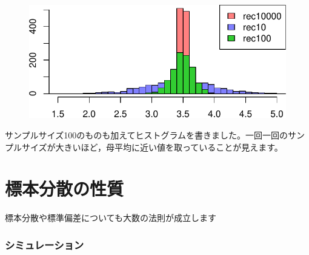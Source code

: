 \documentclass[
  letterpaper,
  DIV=11,
  numbers=noendperiod]{scrreprt}
\begin{document}
\begin{figure}[H]

{\centering \includegraphics{6_hyohon_files/figure-pdf/unnamed-chunk-6-1.pdf}

}

\end{figure}

サンプルサイズ100のものも加えてヒストグラムを書きました。一回一回のサンプルサイズが大きいほど，母平均に近い値を取っていることが見えます。

\hypertarget{ux6a19ux672cux5206ux6563ux306eux6027ux8cea}{%
\chapter{標本分散の性質}\label{ux6a19ux672cux5206ux6563ux306eux6027ux8cea}}

標本分散や標準偏差についても大数の法則が成立します

\hypertarget{ux30b7ux30dfux30e5ux30ecux30fcux30b7ux30e7ux30f3}{%
\subsection{シミュレーション}\label{ux30b7ux30dfux30e5ux30ecux30fcux30b7ux30e7ux30f3}}
\end{document}
